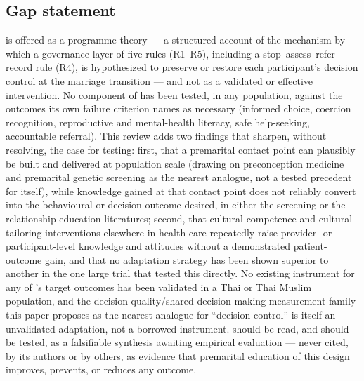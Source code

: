 \subsection{Gap statement}
\tphe{} is offered as a programme theory --- a structured account of the mechanism by which a governance layer of five rules (R1--R5), including a stop--assess--refer--record rule (R4), is hypothesized to preserve or restore each participant's decision control at the marriage transition --- and not as a validated or effective intervention. No component of \tphe{} has been tested, in any population, against the outcomes its own failure criterion names as necessary (informed choice, coercion recognition, reproductive and mental-health literacy, safe help-seeking, accountable referral). This review adds two findings that sharpen, without resolving, the case for testing: first, that a premarital contact point can plausibly be built and delivered at population scale (drawing on preconception medicine and premarital genetic screening as the nearest analogue, not a tested precedent for \tphe{} itself), while knowledge gained at that contact point does not reliably convert into the behavioural or decision outcome desired, in either the screening or the relationship-education literatures; second, that cultural-competence and cultural-tailoring interventions elsewhere in health care repeatedly raise provider- or participant-level knowledge and attitudes without a demonstrated patient-outcome gain, and that no adaptation strategy has been shown superior to another in the one large trial that tested this directly. No existing instrument for any of \tphe{}'s target outcomes has been validated in a Thai or Thai Muslim population, and the decision quality/shared-decision-making measurement family this paper proposes as the nearest analogue for ``decision control'' is itself an unvalidated adaptation, not a borrowed instrument. \tphe{} should be read, and should be tested, as a falsifiable synthesis awaiting empirical evaluation --- never cited, by its authors or by others, as evidence that premarital education of this design improves, prevents, or reduces any outcome.
